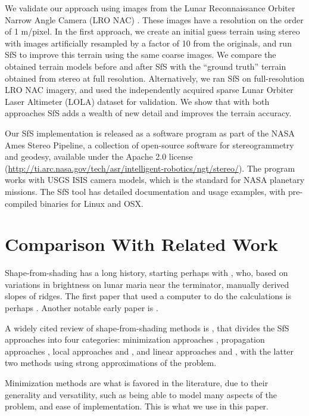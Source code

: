 \documentclass[12pt,oneside]{article}
\begin{document}
We validate our approach using images from the Lunar Reconnaissance
Orbiter Narrow Angle Camera (LRO NAC) \cite{robinson2010lunar}. These
images have a resolution on the order of 1 m/pixel.  In the first
approach, we create an initial guess terrain using stereo with images
artificially resampled by a factor of 10 from the originals, and run SfS
to improve this terrain using the same coarse images. We compare the
obtained terrain models before and after SfS with the ``ground truth''
terrain obtained from stereo at full resolution.  Alternatively, we ran
SfS on full-resolution LRO NAC imagery, and used the independently
acquired sparse Lunar Orbiter Laser Altimeter (LOLA) dataset
\cite{smith2010initial} for validation.  We show that with both
approaches SfS adds a wealth of new detail and improves the terrain
accuracy.

Our SfS implementation is released as a software program as part of the
NASA Ames Stereo Pipeline, a collection of open-source software for
stereogrammetry and geodesy, available under the Apache 2.0 license
(\url{http://ti.arc.nasa.gov/tech/asr/intelligent-robotics/ngt/stereo/}). The
program works with USGS ISIS camera models, which is the standard for
NASA planetary missions. The SfS tool has detailed documentation and
usage examples, with pre-compiled binaries for Linux and OSX.

\section{Comparison With Related Work}
\label{comp}


Shape-from-shading has a long history, starting perhaps with
\citep{van1951photometric}, who, based on variations in brightness on
lunar maria near the terminator, manually derived slopes of ridges.
The first paper that used a computer to do the calculations is perhaps
\citep{rindfleisch1966photometric}. Another notable early paper is \cite{Kirk:1977fk}.


A widely cited review of shape-from-shading methods is
\cite{zhang1999shape}, that divides the SfS approaches into four
categories: minimization approaches \cite{ikeuchi1981numerical},
propagation approaches \cite{horn1970shape}, local approaches
\cite{pentland1984local} and \cite{lee1985improved}, and linear approaches
\cite{pentland1989shape} and \cite{tsai1992fast}, with the latter two
methods using strong approximations of the problem.

Minimization methods are what is favored in the literature, due to their
generality and versatility, such as being able to model many aspects of
the problem, and ease of implementation. This is what we use in this
paper.
\end{document}

